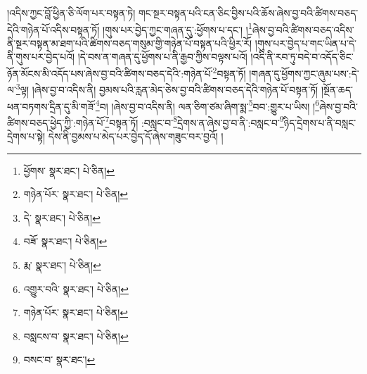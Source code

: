 །འདིས་ཀྱང་བློ་ཕྱིན་ཅི་ལོག་པར་བསྟན་ཏེ། གང་སྔར་བསྟན་པའི་ངན་ཅིང་བྱིས་པའི་ཆོས་ཞེས་བྱ་བའི་ཚིགས་བཅད་དེའི་གཉེན་པོ་འདིས་བསྟན་ཏོ། །གུས་པར་བྱེད་ཀྱང་གཞན་དུ་:ཕྱོགས་པ་དང་། །\footnote{ཕྱོགས་  སྣར་ཐང་།  པེ་ཅིན། }ཞེས་བྱ་བའི་ཚིགས་བཅད་འདིས་ནི་སྔར་བསྟན་མ་ཐག་པའི་ཚིགས་བཅད་གསུམ་གྱི་གཉེན་པོ་བསྟན་པའི་ཕྱིར་རོ། །གུས་པར་བྱེད་པ་གང་ཡིན་པ་དེ་ནི་གུས་པར་བྱེད་པའོ། །དེ་བས་ན་གཞན་དུ་ཕྱོགས་པ་ནི་རྒྱབ་ཀྱིས་བལྟས་པའོ། །འདི་ནི་རབ་ཏུ་བདེ་བ་འདོད་ཅིང་ཉོན་མོངས་མི་འདོད་པས་ཞེས་བྱ་བའི་ཚིགས་བཅད་དེའི་:གཉེན་པོ་\footnote{གཉེན་པོར་  སྣར་ཐང་།  པེ་ཅིན། }བསྟན་ཏོ། །གཞན་དུ་ཕྱོགས་ཀྱང་ཞུམ་པས་:དེ་ལ་\footnote{དེ་  སྣར་ཐང་།  པེ་ཅིན། }ལྟ། །ཞེས་བྱ་བ་འདིས་ནི། བྱམས་པའི་རླན་མེད་ཅེས་བྱ་བའི་ཚིགས་བཅད་དེའི་གཉེན་པོ་བསྟན་ཏོ། །སྔོན་ཆད་ཕན་བཏགས་དྲིན་དུ་མི་གཟོ་\footnote{བཟོ་  སྣར་ཐང་།  པེ་ཅིན། }བ། །ཞེས་བྱ་བ་འདིས་ནི། ལན་ཅིག་ཙམ་ཞིག་སྨ་\footnote{རྨ་  སྣར་ཐང་།  པེ་ཅིན། }བབ་:གྱུར་པ་ཡིས། །\footnote{འགྱུར་བའི་  སྣར་ཐང་།  པེ་ཅིན། }ཞེས་བྱ་བའི་ཚིགས་བཅད་ཕྱེད་ཀྱི་:གཉེན་པོ་\footnote{གཉེན་པོར་  སྣར་ཐང་།  པེ་ཅིན། }བསྟན་ཏོ། :བསླང་བ་\footnote{བསླངས་བ་  སྣར་ཐང་།  པེ་ཅིན། }དྲེགས་ན་ཞེས་བྱ་བ་ནི་:བསླང་བ་\footnote{བསང་བ་  སྣར་ཐང་། }ཉིད་དྲེགས་པ་ནི་བསླང་དྲེགས་པ་སྟེ། དེས་ནི་བྱམས་པ་མེད་པར་བྱེད་དོ་ཞེས་གཟུང་བར་བྱའོ། །
